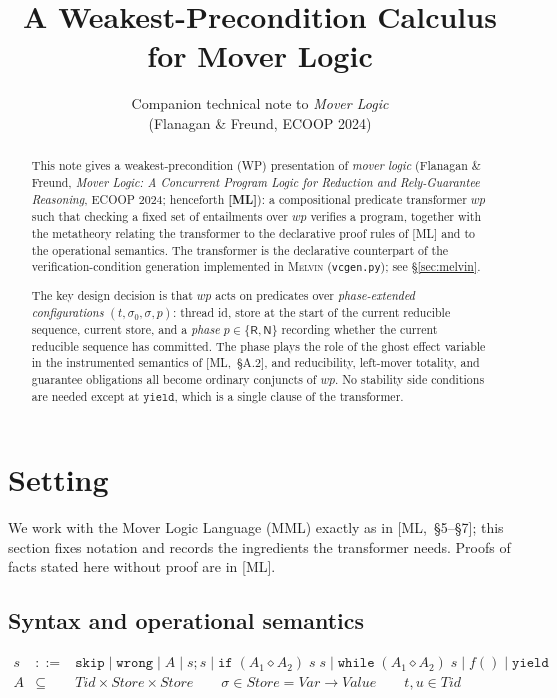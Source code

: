 \documentclass[11pt]{article}
\title{A Weakest-Precondition Calculus for Mover Logic}
\author{Companion technical note to \emph{Mover Logic}\\[2pt]
        \small (Flanagan \& Freund, ECOOP 2024)}
\date{}
\theoremstyle{plain}
\theoremstyle{plain}
\theoremstyle{definition}
\newcommand{\Tid}{\mathit{Tid}}
\newcommand{\Store}{\mathit{Store}}
\newcommand{\Var}{\mathit{Var}}
\newcommand{\Value}{\mathit{Value}}
\newcommand{\MR}{\mathsf{R}}
\newcommand{\MN}{\mathsf{N}}
\newcommand{\wpx}{\mathit{wp}}
\newcommand{\tskip}{\mathtt{skip}}
\newcommand{\twrong}{\mathtt{wrong}}
\newcommand{\tyield}{\mathtt{yield}}
\newcommand{\kif}{\mathtt{if}}
\newcommand{\kwhile}{\mathtt{while}}
\newcommand{\cact}[2]{#1\diamond #2}                 %
\newcommand{\melvin}{\textsc{Melvin}}
\newcommand{\code}[1]{\texttt{#1}}
\begin{document}
\maketitle

\begin{abstract}
This note gives a weakest-precondition (WP) presentation of \emph{mover logic}
(Flanagan \& Freund, \emph{Mover Logic: A Concurrent Program Logic for Reduction
and Rely-Guarantee Reasoning}, ECOOP 2024; henceforth \textbf{[ML]}): a
compositional predicate transformer $\wpx$ such that checking a fixed set of
entailments over $\wpx$ verifies a program, together with the metatheory relating
the transformer to the declarative proof rules of [ML] and to the operational
semantics. The transformer is the declarative counterpart of the
verification-condition generation implemented in \melvin{} (\code{vcgen.py}); see
\S\ref{sec:melvin}.

The key design decision is that $\wpx$ acts on predicates over
\emph{phase-extended configurations} $(t,\sigma_0,\sigma,p)$: thread id, store at
the start of the current reducible sequence, current store, and a \emph{phase}
$p\in\{\MR,\MN\}$ recording whether the current reducible sequence has committed.
The phase plays the role of the ghost effect variable in the instrumented
semantics of [ML,~\S A.2], and reducibility, left-mover totality, and guarantee
obligations all become ordinary conjuncts of $\wpx$. No stability side conditions
are needed except at $\tyield$, which is a single clause of the transformer.
\end{abstract}

\section{Setting}\label{sec:setting}

We work with the Mover Logic Language (MML) exactly as in [ML,~\S5--\S7]; this
section fixes notation and records the ingredients the transformer needs. Proofs
of facts stated here without proof are in [ML].

\subsection{Syntax and operational semantics}

\[
\begin{array}{rcl}
s &::=& \tskip \mid \twrong \mid A \mid s;s
        \mid \kif\;(\cact{A_1}{A_2})\;s\;s
        \mid \kwhile\;(\cact{A_1}{A_2})\;s \mid f() \mid \tyield\\
A &\subseteq& \Tid\times\Store\times\Store
\qquad \sigma\in\Store=\Var\to\Value
\qquad t,u\in\Tid
\end{array}
\]
\end{document}
